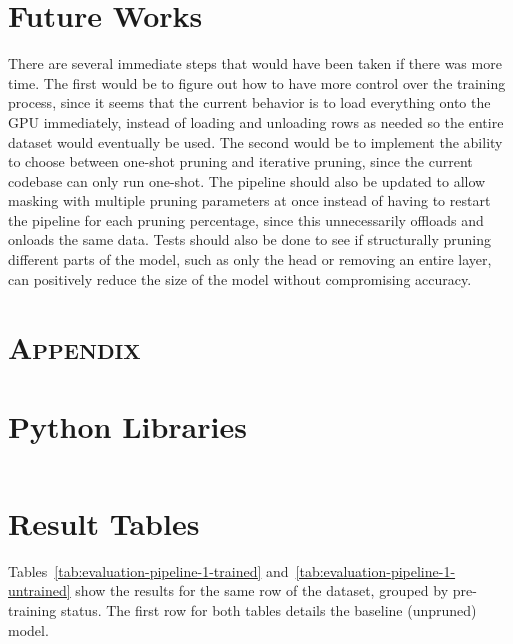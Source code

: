 \documentclass[
	title={Lottery Ticket Hypothesis for Large Language Models}
]{cs595project}
\newcommand{\ablationunix}{1778204079} %
\providecommand{\ablationunix}{1778204079}
\begin{document}
\section{Future Works}\label{sec:future-works}
There are several immediate steps that would have been taken if there was more time.
The first would be to figure out how to have more control over the training process, since it seems that the current behavior is to load everything onto the GPU immediately, instead of loading and unloading rows as needed so the entire dataset would eventually be used.
The second would be to implement the ability to choose between one-shot pruning and iterative pruning, since the current codebase can only run one-shot.
The pipeline should also be updated to allow masking with multiple pruning parameters at once instead of having to restart the pipeline for each pruning percentage, since this unnecessarily offloads and onloads the same data.
Tests should also be done to see if structurally pruning different parts of the model, such as only the head or removing an entire layer, can positively reduce the size of the model without compromising accuracy.

\printbibliography[title={References}, heading=subbibnumbered]

\appendix
\section*{\textsc{Appendix}}
\renewcommand{\thesection}{\Alph{section}.}

\section{Python Libraries}\label{sec:python-libraries}
\inputminted{text}{../requirements.txt}

\section{Result Tables}\label{sec:result-tables}
Tables~\ref{tab:evaluation-pipeline-1-trained} and~\ref{tab:evaluation-pipeline-1-untrained} show the results for the same row of the dataset, grouped by pre-training status.
The first row for both tables details the baseline (unpruned) model.




\end{document}
